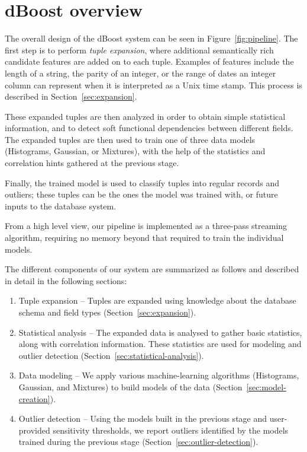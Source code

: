 \section{dBoost overview}
\label{sec:overview}

\begin{figure*}
  \centering %
  \caption{The \dBoost/ pipeline}
  \label{fig:pipeline}
\end{figure*}

The overall design of the dBoost system can be seen in Figure~\ref{fig:pipeline}.
The first step is to perform \emph{tuple expansion}, where additional semantically rich candidate features are added on to each tuple.
Examples of features include the length of a string, the parity of an integer, or the range of dates an integer column can represent when it is interpreted as a Unix time stamp. This process is described in Section~\ref{sec:expansion}.

These expanded tuples are then analyzed in order to obtain simple statistical information, and to detect soft functional dependencies between different fields. The expanded tuples are then used to train one of three data models (Histograms, Gaussian, or Mixtures), with the help of the statistics and correlation hints gathered at the previous stage.

Finally, the trained model is used to classify tuples into regular records and outliers; these tuples can be the ones the model was trained with, or future inputs to the database system.

From a high level view, our pipeline is implemented as a three-pass streaming algorithm, requiring no memory beyond that required to train the individual models.

The different components of our system are summarized as follows and described in detail in the following sections:

\begin{enumerate}
\item Tuple expansion -- Tuples are expanded using knowledge about the database schema and field types (Section~\ref{sec:expansion}).
\item Statistical analysis -- The expanded data is analysed to gather basic statistics, along with correlation information. These statistics are used for modeling and outlier detection (Section~\ref{sec:statistical-analysis}).
\item Data modeling -- We apply various machine-learning algorithms (Histograms, Gaussian, and Mixtures) to build models of the data (Section~\ref{sec:model-creation}).
\item Outlier detection -- Using the models built in the previous stage and user-provided sensitivity thresholds, we report outliers identified by the models trained during the previous stage (Section~\ref{sec:outlier-detection}).
\end{enumerate}

